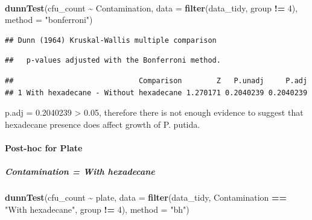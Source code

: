 \documentclass[
]{article}
\newenvironment{Shaded}{\begin{snugshade}}{\end{snugshade}}
\newcommand{\AttributeTok}[1]{\textcolor[rgb]{0.13,0.29,0.53}{#1}}
\newcommand{\DecValTok}[1]{\textcolor[rgb]{0.00,0.00,0.81}{#1}}
\newcommand{\FunctionTok}[1]{\textcolor[rgb]{0.13,0.29,0.53}{\textbf{#1}}}
\newcommand{\NormalTok}[1]{#1}
\newcommand{\SpecialCharTok}[1]{\textcolor[rgb]{0.81,0.36,0.00}{\textbf{#1}}}
\newcommand{\StringTok}[1]{\textcolor[rgb]{0.31,0.60,0.02}{#1}}
\begin{document}
\paragraph{}\label{section}

\begin{Shaded}
\begin{Highlighting}[]
\FunctionTok{dunnTest}\NormalTok{(cfu\_count }\SpecialCharTok{\textasciitilde{}}\NormalTok{ Contamination, }\AttributeTok{data =} \FunctionTok{filter}\NormalTok{(data\_tidy, group }\SpecialCharTok{!=} \DecValTok{4}\NormalTok{), }\AttributeTok{method =} \StringTok{"bonferroni"}\NormalTok{)}
\end{Highlighting}
\end{Shaded}

\begin{verbatim}
## Dunn (1964) Kruskal-Wallis multiple comparison
\end{verbatim}

\begin{verbatim}
##   p-values adjusted with the Bonferroni method.
\end{verbatim}

\begin{verbatim}
##                             Comparison        Z   P.unadj     P.adj
## 1 With hexadecane - Without hexadecane 1.270171 0.2040239 0.2040239
\end{verbatim}

p.adj = 0.2040239 \textgreater{} 0.05, therefore there is not enough
evidence to suggest that hexadecane presence does affect growth of P.
putida.

\paragraph{Post-hoc for Plate}\label{post-hoc-for-plate}

\subparagraph{Contamination = With
hexadecane}\label{contamination-with-hexadecane}

\subparagraph{}\label{section-1}

\begin{Shaded}
\begin{Highlighting}[]
\FunctionTok{dunnTest}\NormalTok{(cfu\_count }\SpecialCharTok{\textasciitilde{}}\NormalTok{ plate, }\AttributeTok{data =} \FunctionTok{filter}\NormalTok{(data\_tidy, Contamination }\SpecialCharTok{==} \StringTok{"With hexadecane"}\NormalTok{, group }\SpecialCharTok{!=} \DecValTok{4}\NormalTok{), }\AttributeTok{method =} \StringTok{"bh"}\NormalTok{)}
\end{Highlighting}
\end{Shaded}
\end{document}
